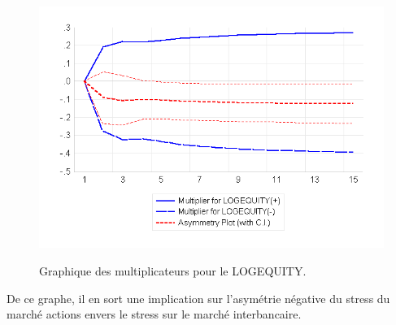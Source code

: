 \begin{figure}[H]
    \centering
    \caption{Graphique des multiplicateurs pour le LOGEQUITY.}
\includegraphics{figures/logforex.png}
    \label{fig:msih_resids}
\end{figure}

De ce graphe, il en sort une implication sur l'asymétrie négative du stress du marché actions envers le stress sur le marché interbancaire.

